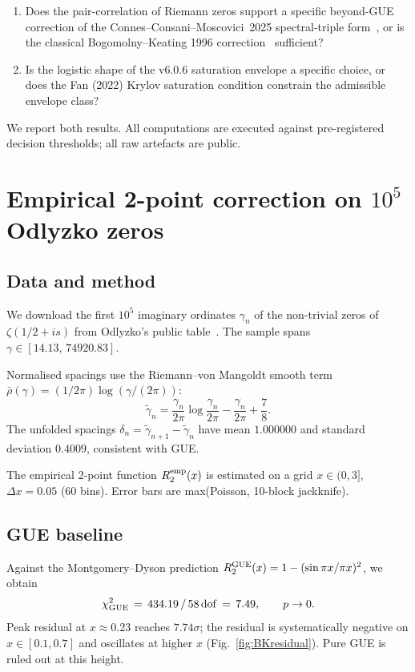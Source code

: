 \documentclass[aps,prd,superscriptaddress,nofootinbib,floatfix,10pt]{revtex4-2}
\begin{document}
\begin{enumerate}
 \item Does the pair-correlation of Riemann zeros support a specific
   beyond-GUE correction of the Connes--Consani--Moscovici~2025
   spectral-triple form~\cite{ConnesConsaniMoscovici2025}, or is the
   classical Bogomolny--Keating 1996
   correction~\cite{BogomolnyKeating1996} sufficient?
 \item Is the logistic shape of the v6.0.6 saturation envelope a specific
   choice, or does the Fan (2022) Krylov saturation condition
   constrain the admissible envelope class?
\end{enumerate}

We report both results. All computations are executed against
pre-registered decision thresholds; all raw artefacts are public.

\section{Empirical 2-point correction on $10^{5}$ Odlyzko zeros}

\subsection{Data and method}

We download the first $10^{5}$ imaginary ordinates
$\gamma_{n}$ of the non-trivial zeros of $\zeta(1/2+is)$ from
Odlyzko's public table~\cite{OdlyzkoTables}. The sample spans
$\gamma\in[14.13,\,74920.83]$.

Normalised spacings use the Riemann--von Mangoldt smooth term
$\bar{\rho}(\gamma) = (1/2\pi)\log(\gamma/(2\pi))$:
\begin{equation}
 \tilde{\gamma}_{n} = \frac{\gamma_{n}}{2\pi}
 \log\frac{\gamma_{n}}{2\pi} - \frac{\gamma_{n}}{2\pi} + \frac{7}{8}.
\end{equation}
The unfolded spacings $\delta_{n} = \tilde{\gamma}_{n+1}-\tilde{\gamma}_{n}$
have mean $1.000000$ and standard deviation $0.4009$, consistent with
GUE.

The empirical 2-point function $R_{2}^{\rm emp}(x)$ is estimated on a
grid $x\in(0, 3]$, $\Delta x = 0.05$ ($60$ bins). Error bars are
max(Poisson, 10-block jackknife).

\subsection{GUE baseline}

Against the Montgomery--Dyson prediction
$R_{2}^{\rm GUE}(x) = 1-(\sin\pi x/\pi x)^{2}$, we obtain
\begin{equation*}
 \chi^{2}_{\rm GUE} \,=\, 434.19\,/\,58\,\mathrm{dof}
 \,=\, 7.49, \qquad p\to 0.
\end{equation*}
Peak residual at $x\approx 0.23$ reaches $7.74\sigma$; the residual is
systematically negative on $x\in[0.1,0.7]$ and oscillates at higher
$x$ (Fig.~\ref{fig:BKresidual}). Pure GUE is ruled out at this
height.
\end{document}
